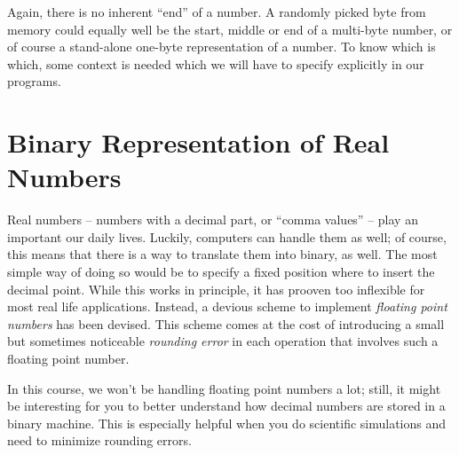 \begin{hintbox}
Again, there is no inherent \enquote{end} of a number. A randomly picked byte from memory could equally well be the start, middle or end of a multi-byte number, or of course a stand-alone one-byte representation of a number. To know which is which, some context is needed which we will have to specify explicitly in our programs.
\end{hintbox}

\section{Binary Representation of Real Numbers}
Real numbers -- numbers with a decimal part, or \enquote{comma values} -- play an important our daily lives. Luckily, computers can handle them as well; of course, this means that there is a way to translate them into binary, as well. The most simple way of doing so would be to specify a fixed position where to insert the decimal point. While this works in principle, it has prooven too inflexible for most real life applications. Instead, a devious scheme to implement \emph{floating point numbers} has been devised. This scheme comes at the cost of introducing a small but sometimes noticeable \emph{rounding error} in each operation that involves such a floating point number.

In this course, we won't be handling floating point numbers a lot; still, it might be interesting for you to better understand how decimal numbers are stored in a binary machine. This is especially helpful when you do scientific simulations and need to minimize rounding errors.


